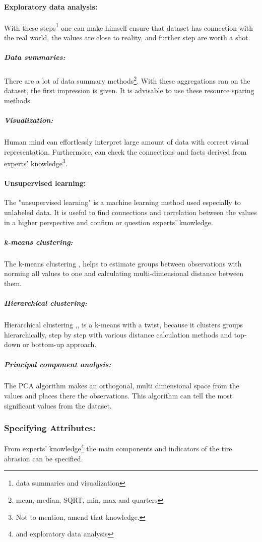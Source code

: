		\paragraph{Exploratory data analysis:}
			With these steps\footnote{data summaries and visualization} one can make himself ensure that dataset has connection with the real world, the values are close to reality, and further step are worth a shot.
			\subparagraph{Data summaries:}
			There are a lot of data summary methods\footnote{mean, median, SQRT, min, max and quarters}. With these aggregations ran on the dataset, the first impression is given. It is advisable to use these resource sparing methods.
			\subparagraph{Visualization:}
			Human mind can effortlessly interpret large amount of data with correct visual representation. Furthermore, can check the connections and facts derived from experts' knowledge\footnote{Not to mention, amend that knowledge.}. 
		\paragraph{Unsupervised learning:}
		The "unsupervised learning" \cite{UnsuplearnBook} is a machine learning method used especially to unlabeled data. It is useful to find connections and correlation between the values in a higher perspective and confirm or question experts' knowledge.
			\subparagraph{k-means clustering:}
			The k-means clustering \cite{k-means},\cite{kmeans2} helps to estimate groups between observations with norming all values to one and calculating multi-dimensional distance between them.
			\subparagraph{Hierarchical clustering:}
			Hierarchical clustering \cite{h-clust},\cite{h-clust2},\cite{Clustering} is a k-means with a twist, because it clusters groups hierarchically, step by step with various distance calculation methods and top-down or bottom-up approach.
			\subparagraph{Principal component analysis:}
			The PCA \cite{PCA} algorithm makes an orthogonal, multi dimensional space from the values and places there the observations. This algorithm can tell the most significant values from the dataset.
	\subsubsection{Specifying Attributes:}
	From experts' knowledge\footnote{and exploratory data analysis} the main components and indicators of the tire abrasion can be specified.

